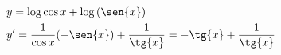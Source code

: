 \begin{ex}
\begin{align}
&y= \log{\cos{x}}+\log{(\sen{x})}\nonumber\\
&y'=\frac{1}{\cos{x}}(-\sen{x})+\frac{1}{\tg{x}}=-\tg{x}+\frac{1}{\tg{x}}\nonumber
\end{align}
\end{ex}